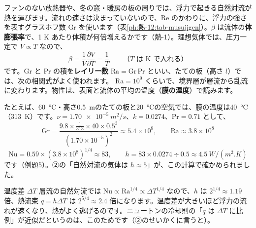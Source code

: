 \label{ph:熱-12:sec7}
ファンのない放熱器や、冬の窓・暖房の板の周りでは、浮力で起きる自然対流が熱を運びます。流れの速さは決まっていないので、Re のかわりに、浮力の強さを表すグラスホフ数 Gr を使います（表\ref{ph:熱-12:tab-musujigen}）。$\beta$ は流体の\textbf{体膨張率}で、1 K あたり体積が何倍増えるかです（熱-1）。理想気体では、圧力一定で $V\propto T$ なので、
\[\beta=\frac{1}{V}\frac{\partial V}{\partial T}=\frac{1}{T}\qquad\text{（$T$ は K で入れる）}\]
です。Gr と Pr の積を\textbf{レイリー数} $\mathrm{Ra}=\mathrm{Gr}\,\mathrm{Pr}$ といい、たての板（高さ $l$）では、次の相関式がよく使われます。
$\mathrm{Ra}=10^9$ くらいで、境界層が層流から乱流に変わります。物性は、表面と流体の平均の温度（\textbf{膜の温度}）で読みます。

\noindent たとえば、\qty{60}{\celsius}・高さ\qty{0.5}{m}のたての板と\qty{20}{\celsius}の空気では、膜の温度は\qty{40}{\celsius}（\qty{313}{K}）です。$\nu=\qty{1.70e-5}{m^2/s}$、$k=0.0274$、$\mathrm{Pr}=0.71$ として、
\[\mathrm{Gr}=\frac{9.8\times\frac{1}{313}\times40\times0.5^3}{(1.70\times10^{-5})^2}\approx5.4\times10^8,\qquad\mathrm{Ra}\approx3.8\times10^8\]
\[\mathrm{Nu}=0.59\times(3.8\times10^8)^{1/4}\approx83,\qquad h=83\times0.0274\div0.5\approx\qty{4.5}{W/(m^2.K)}\]
です（例題5）。②の「自然対流の気体は $h\approx5$」が、この計算で確かめられました。

\begin{phbaisuru}{温度差 $\Delta T$}
層流の自然対流では $\mathrm{Nu}\propto\mathrm{Ra}^{1/4}\propto\Delta T^{1/4}$ なので、$h$ は $2^{1/4}\approx1.19$ 倍、熱流束 $q=h\Delta T$ は $2^{5/4}\approx2.4$ 倍になります。温度差が大きいほど浮力の流れが速くなり、熱がよく逃げるのです。ニュートンの冷却則の「$q$ は $\Delta T$ に比例」が近似だというのは、このためです（②のせいかくに言うと）。
\end{phbaisuru}

